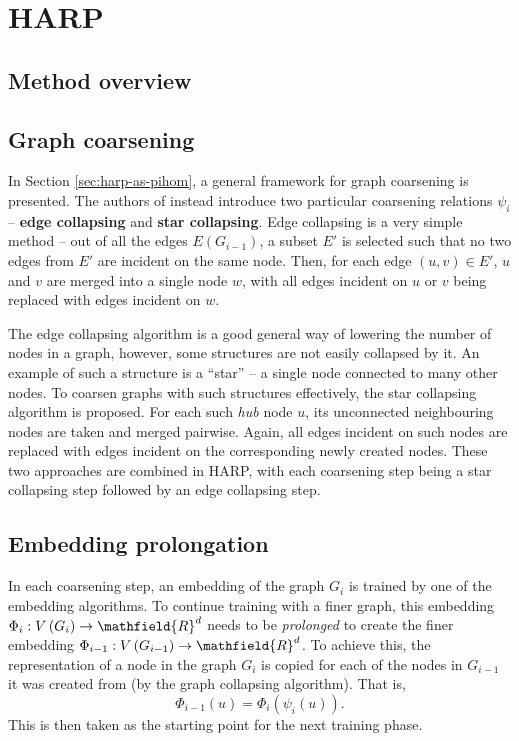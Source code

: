 \section{HARP}\label{sec:harp}

\subsection{Method overview}

\subsection{Graph coarsening}\label{sec:graph-coarsening}

In Section \ref{sec:harp-as-pihom}, a general framework for graph coarsening is presented. The authors of \cite{chen_harp_2018} instead introduce two particular coarsening relations \( \psi_i \) -- \textbf{edge collapsing} and \textbf{star collapsing}. Edge collapsing is a very simple method -- out of all the edges \( E \left( G_{i - 1} \right) \), a subset \( E' \) is selected such that no two edges from \( E' \) are incident on the same node. Then, for each edge \( \left( u, v \right) \in E' \), \( u \) and \( v \) are merged into a single node \( w \), with all edges incident on \( u \) or \( v \) being replaced with edges incident on \( w \).

The edge collapsing algorithm is a good general way of lowering the number of nodes in a graph, however, some structures are not easily collapsed by it. An example of such a structure is a \enquote{star} -- a single node connected to many other nodes. To coarsen graphs with such structures effectively, the star collapsing algorithm is proposed. For each such \textit{hub} node \( u \), its unconnected neighbouring nodes are taken and merged pairwise. Again, all edges incident on such nodes are replaced with edges incident on the corresponding newly created nodes. These two approaches are combined in HARP, with each coarsening step being a star collapsing step followed by an edge collapsing step.

\subsection{Embedding prolongation}
In each coarsening step, an embedding of the graph \( G_i \) is trained by one of the embedding algorithms. To continue training with a finer graph, this embedding \( \Phi_i: V \left( G_i \right) \to \mathfield{R}^d \) needs to be \textit{prolonged} to create the finer embedding \( \Phi_{i - 1}: V \left( G_{i - 1} \right) \to \mathfield{R}^d \). To achieve this, the representation of a node in the graph \( G_i \) is copied for each of the nodes in \( G_{i - 1} \) it was created from (by the graph collapsing algorithm). That is,
\[ \Phi_{i - 1} \left( u \right) = \Phi_i \left( \psi_i \left( u \right) \right)\text{.} \]
This is then taken as the starting point for the next training phase.
